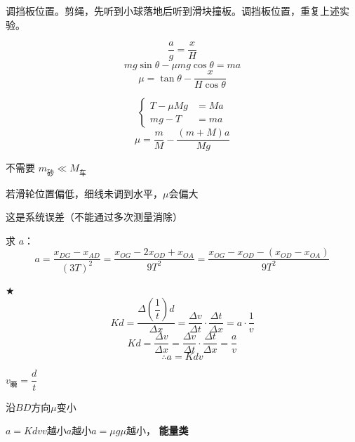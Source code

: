 调挡板位置。剪绳，先听到小球落地后听到滑块撞板。调挡板位置，重复上述实验。


\[ \frac{a}{g}=\frac{x}{H} \]
\[ mg\sin\theta-\mu mg\cos\theta=ma \]
\[ \mu=\tan\theta-\frac{x}{H\cos\theta} \]

\[
\left\{\begin{aligned}
T-\mu Mg&=Ma\\
mg-T&=ma
\end{aligned}\right.
\]
\[ \mu=\frac{m}{M}-\frac{(m+M)a}{Mg} \]

不需要 $m_{\text{砂}}\ll M_{\text{车}}$ %

若滑轮位置偏低，细线未调到水平，$\mu$会偏大

这是系统误差（不能通过多次测量消除）

求 $a$：
\[ a=\frac{x_{DG}-x_{AD}}{(3T)^2}=\frac{x_{OG}-2x_{OD}+x_{OA}}{9T^2}=\frac{x_{OG}-x_{OD}-(x_{OD}-x_{OA})}{9T^2} \]

$\bigstar$ %
\[ Kd=\frac{\Delta\!\left(\dfrac{1}{t}\right)d}{\Delta x}=\frac{\Delta v}{\Delta t}\cdot\frac{\Delta t}{\Delta x}=a\cdot\frac{1}{v} \]
\[ Kd=\frac{\Delta v}{\Delta x}=\frac{\Delta v}{\Delta t}\cdot\frac{\Delta t}{\Delta x}=\frac{a}{v} \]
\[ \therefore a=Kdv \]


$v_{\text{瞬}}=\dfrac{d}{t}$

沿$BD$方向$\mu$变小

$a=Kdv$\quad $v$越小$a$越小\quad $a=\mu g$\quad $\mu$越小，
\textbf{能量类}

